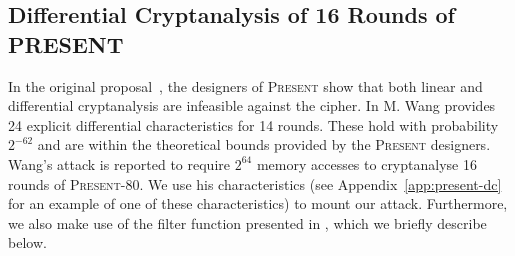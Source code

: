 \documentclass{llncs}
\newcommand{\PRESENT}{\textsc{Present}\xspace}
\begin{document}

\subsection{Differential Cryptanalysis of 16 Rounds of PRESENT}
\label{sec:present-dc}

In the original proposal~\cite{present}, the designers of \PRESENT show that
both linear and differential cryptanalysis are infeasible against the cipher. In
\cite{present-dc:africacrypt,present-differentials} M. Wang provides 24 explicit
differential characteristics for 14 rounds. These hold with
probability $2^{-62}$ and are within the theoretical bounds provided
by the \PRESENT designers. Wang's attack is reported to require
$2^{64}$ memory accesses to cryptanalyse 16 rounds of \PRESENT-80. We use his
characteristics (see Appendix~\ref{app:present-dc} for an example of one of
these
characteristics) to mount our attack. Furthermore, we also make use of the
filter function presented in \cite{present-dc:africacrypt}, which we briefly describe below.
\end{document}
